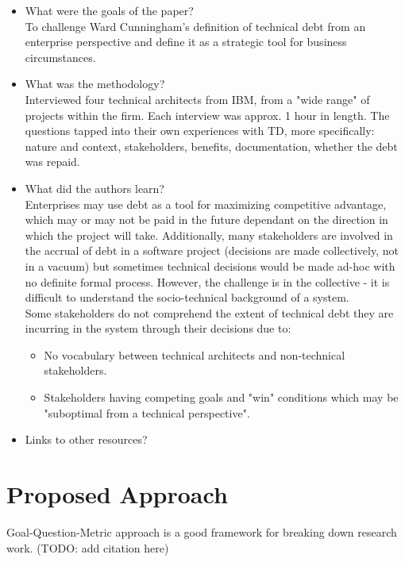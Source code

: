 \documentclass{mprop}
\begin{document}
\begin{itemize}
	\item What were the goals of the paper? \\
	      To challenge Ward Cunningham's definition of technical debt from an enterprise perspective and define it as a strategic tool for business circumstances.
	\item What was the methodology? \\
	      Interviewed four technical architects from IBM, from a "wide range" of projects within the firm. Each interview was approx. 1 hour in length.
	      The questions tapped into their own experiences with TD, more specifically: nature and context, stakeholders, benefits, documentation, whether the debt was repaid.
	\item What did the authors learn? \\
	      Enterprises may use debt as a tool for maximizing competitive advantage, which may or may not be paid in the future dependant on the direction in which the project will take.
	      Additionally, many stakeholders are involved in the accrual of debt in a software project (decisions are made collectively, not in a vacuum) but sometimes technical decisions would be made ad-hoc with no definite formal process.
	      However, the challenge is in the collective - it is difficult to understand the socio-technical background of a system. \\

	      Some stakeholders do not comprehend the extent of technical debt they are incurring in the system through their decisions due to:
	      \begin{itemize}
		      \item No vocabulary between technical architects and non-technical stakeholders.
		      \item Stakeholders having competing goals and "win" conditions which may be "suboptimal from a technical perspective".
	      \end{itemize}
	\item Links to other resources?
\end{itemize}

\section{Proposed Approach}

Goal-Question-Metric approach is a good framework for breaking down research work. (TODO: add citation here)
\end{document}
